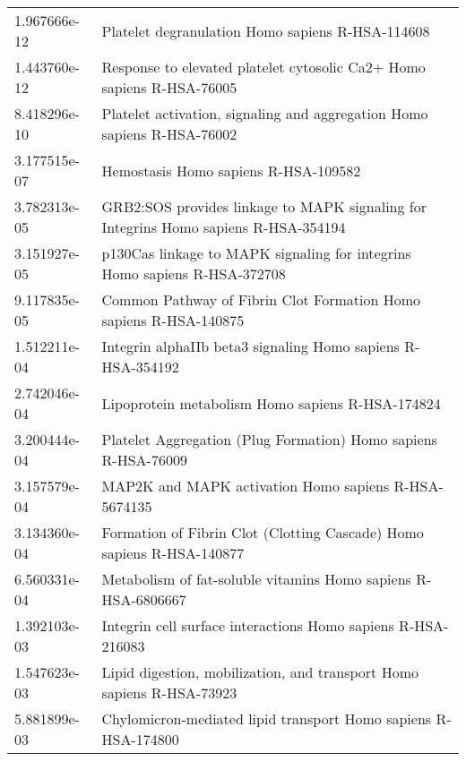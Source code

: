 \begin{longtable}{p{2.4cm}p{14.5cm}}
\bottomrule
\endlastfoot
             1.967666e-12 &                                              Platelet degranulation Homo sapiens R-HSA-114608 \\
             1.443760e-12 &                         Response to elevated platelet cytosolic Ca2+ Homo sapiens R-HSA-76005 \\
             8.418296e-10 &                       Platelet activation, signaling and aggregation Homo sapiens R-HSA-76002 \\
             3.177515e-07 &                                                          Hemostasis Homo sapiens R-HSA-109582 \\
             3.782313e-05 &           GRB2:SOS provides linkage to MAPK signaling for Integrins Homo sapiens R-HSA-354194 \\
             3.151927e-05 &                     p130Cas linkage to MAPK signaling for integrins Homo sapiens R-HSA-372708 \\
             9.117835e-05 &                             Common Pathway of Fibrin Clot Formation Homo sapiens R-HSA-140875 \\
             1.512211e-04 &                                   Integrin alphaIIb beta3 signaling Homo sapiens R-HSA-354192 \\
             2.742046e-04 &                                              Lipoprotein metabolism Homo sapiens R-HSA-174824 \\
             3.200444e-04 &                                Platelet Aggregation (Plug Formation) Homo sapiens R-HSA-76009 \\
             3.157579e-04 &                                          MAP2K and MAPK activation Homo sapiens R-HSA-5674135 \\
             3.134360e-04 &                         Formation of Fibrin Clot (Clotting Cascade) Homo sapiens R-HSA-140877 \\
             6.560331e-04 &                                 Metabolism of fat-soluble vitamins Homo sapiens R-HSA-6806667 \\
             1.392103e-03 &                                  Integrin cell surface interactions Homo sapiens R-HSA-216083 \\
             1.547623e-03 &                         Lipid digestion, mobilization, and transport Homo sapiens R-HSA-73923 \\
             5.881899e-03 &                                Chylomicron-mediated lipid transport Homo sapiens R-HSA-174800 \\

\end{longtable}
